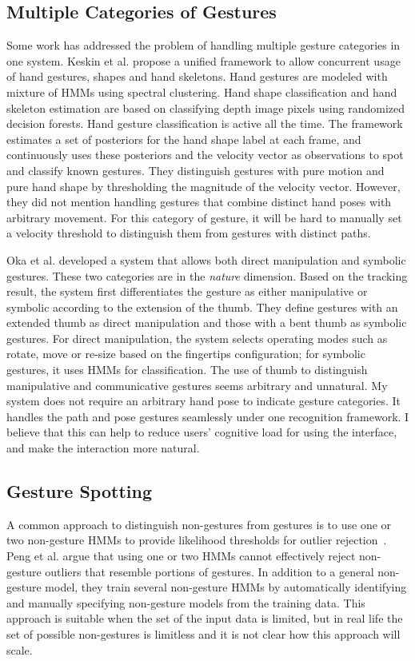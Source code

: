 \subsection{Multiple Categories of Gestures}
Some work has addressed the problem of handling multiple gesture
categories in one system. Keskin et al. \cite{keskin12} propose a unified
framework to allow concurrent usage of hand gestures, shapes and hand skeletons. 
Hand gestures are modeled with mixture of HMMs using spectral clustering. Hand shape classification and
hand skeleton estimation are based on classifying depth image pixels
using randomized decision forests.
Hand gesture classification is active all the time. The framework estimates a set of
posteriors for the hand shape label at each frame, and continuously uses these
posteriors and the velocity vector as observations to spot and classify known
gestures. They distinguish gestures with pure motion and pure hand shape by
thresholding the magnitude of the velocity vector. However, they did not mention
handling gestures that combine distinct hand poses with arbitrary movement.
For this category of gesture, it will be hard to manually set a velocity
threshold to distinguish them from gestures with distinct paths.

Oka et al. \cite{Oka02} developed a system that
allows both direct manipulation and symbolic gestures. These two categories
are in the \textit{nature} dimension. Based on the tracking result, the system
first differentiates the gesture as either manipulative or symbolic according to
the extension of the thumb. They define gestures with an extended thumb as
direct manipulation and those with a bent thumb as symbolic gestures.
For direct manipulation, the system selects operating modes such as rotate, 
move or re-size based on the fingertips configuration; for symbolic gestures, it 
uses HMMs for classification. The use of thumb to distinguish
manipulative and communicative gestures seems arbitrary and unnatural. 
My system does not
require an arbitrary hand pose to indicate gesture categories. It handles the
path and pose gestures seamlessly under one recognition framework. I believe
that this can help to reduce users' cognitive load for using the interface, and
make the interaction more natural.

\subsection{Gesture Spotting}
A common approach to distinguish non-gestures from gestures is to use one or two
non-gesture HMMs to provide likelihood thresholds for outlier rejection~\cite{yang07}. 
Peng et al. \cite{peng11} argue that using one or two HMMs cannot
effectively reject non-gesture outliers that resemble portions of
gestures. In addition to a general non-gesture model, they train several
non-gesture HMMs by automatically identifying and manually specifying
non-gesture models from the training data. This approach is suitable when the
set of the input data is limited, but in real life the set
of possible non-gestures is limitless and it is not clear how this
approach will scale.

